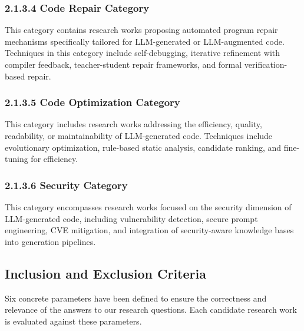 \documentclass[11pt,a4paper]{article}
\begin{document}
\subsubsection*{2.1.3.4 Code Repair Category}
This category contains research works proposing automated program repair mechanisms specifically tailored for LLM-generated or LLM-augmented code. Techniques in this category include self-debugging, iterative refinement with compiler feedback, teacher-student repair frameworks, and formal verification-based repair.

\subsubsection*{2.1.3.5 Code Optimization Category}
This category includes research works addressing the efficiency, quality, readability, or maintainability of LLM-generated code. Techniques include evolutionary optimization, rule-based static analysis, candidate ranking, and fine-tuning for efficiency.

\subsubsection*{2.1.3.6 Security Category}
This category encompasses research works focused on the security dimension of LLM-generated code, including vulnerability detection, secure prompt engineering, CVE mitigation, and integration of security-aware knowledge bases into generation pipelines.

\subsection{Inclusion and Exclusion Criteria}
\label{sec:inclusion_criteria}

Six concrete parameters have been defined to ensure the correctness and relevance of the answers to our research questions. Each candidate research work is evaluated against these parameters.
\end{document}
